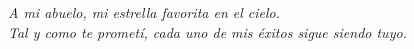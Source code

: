
\null{}
\begin{flushright}
\emph{A mi abuelo, mi estrella favorita en el cielo. \\ %
Tal y como te prometí, cada uno de mis éxitos sigue siendo tuyo.}
\end{flushright}
\null
\cleardoublepage